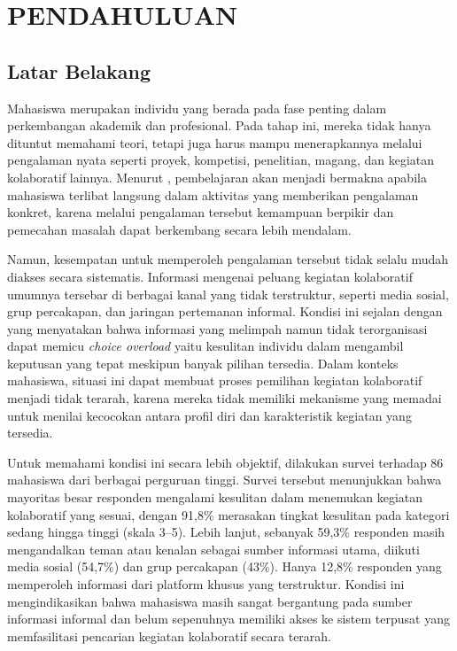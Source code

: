 \cleardoublepage %
\chapter{PENDAHULUAN}
\label{chap:pendahuluan}

\section{Latar Belakang}

Mahasiswa merupakan individu yang berada pada fase penting dalam perkembangan akademik dan profesional. Pada tahap ini, mereka tidak hanya dituntut memahami teori, tetapi juga harus mampu menerapkannya melalui pengalaman nyata seperti proyek, kompetisi, penelitian, magang, dan kegiatan kolaboratif lainnya. Menurut \textcite{dewey1938}, pembelajaran akan menjadi bermakna apabila mahasiswa terlibat langsung dalam aktivitas yang memberikan pengalaman konkret, karena melalui pengalaman tersebut kemampuan berpikir dan pemecahan masalah dapat berkembang secara lebih mendalam.

Namun, kesempatan untuk memperoleh pengalaman tersebut tidak selalu mudah diakses secara sistematis. Informasi mengenai peluang kegiatan kolaboratif umumnya tersebar di berbagai kanal yang tidak terstruktur, seperti media sosial, grup percakapan, dan jaringan pertemanan informal. Kondisi ini sejalan dengan \textcite{schwartz2004} yang menyatakan bahwa informasi yang melimpah namun tidak terorganisasi dapat memicu \emph{choice overload} yaitu kesulitan individu dalam mengambil keputusan yang tepat meskipun banyak pilihan tersedia. Dalam konteks mahasiswa, situasi ini dapat membuat proses pemilihan kegiatan kolaboratif menjadi tidak terarah, karena mereka tidak memiliki mekanisme yang memadai untuk menilai kecocokan antara profil diri dan karakteristik kegiatan yang tersedia.

Untuk memahami kondisi ini secara lebih objektif, dilakukan survei terhadap 86 mahasiswa dari berbagai perguruan tinggi. Survei tersebut menunjukkan bahwa mayoritas besar responden mengalami kesulitan dalam menemukan kegiatan kolaboratif yang sesuai, dengan 91,8\% merasakan tingkat kesulitan pada kategori sedang hingga tinggi (skala 3--5). Lebih lanjut, sebanyak 59,3\% responden masih mengandalkan teman atau kenalan sebagai sumber informasi utama, diikuti media sosial (54,7\%) dan grup percakapan (43\%). Hanya 12,8\% responden yang memperoleh informasi dari platform khusus yang terstruktur. Kondisi ini mengindikasikan bahwa mahasiswa masih sangat bergantung pada sumber informasi informal dan belum sepenuhnya memiliki akses ke sistem terpusat yang memfasilitasi pencarian kegiatan kolaboratif secara terarah.

